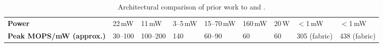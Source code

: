{\begin{table*}
{\begin{tabular}{l|p{0.7in}p{0.7in}p{0.7in}|p{0.7in}p{0.7in}p{0.7in}|p{0.7in}|p{0.7in}}
    \midrule
    \bf Power               & 22\,mW                                         & 11\,mW             & 3--5\,mW           & 15--70\,mW                              & 160\,mW                            & 20\,W                                & $<$1\,mW               & $<$1\,mW           \\[.5ex]
    \bf Peak MOPS/mW (approx.)   & 30--100                                        & 100--200           & 140                & 60--90                                  & 60                                 & 60                                   & 305 (fabric)      & 438 (fabric)                  \\[.5ex]
    \bottomrule
  \end{tabular}
  }
  \caption{Architectural comparison of prior work to \snafu and \riptide.}
  \label{tab:motivation}
\end{table*}
}